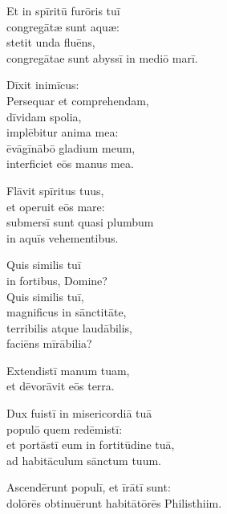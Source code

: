 \begin{flushleft}
{    Et in spīritū furōris tuī\\
    congregātæ sunt aquæ:\\
    stetit unda fluēns,\\
    congregātae sunt abyssī in mediō marī.

    Dīxit inimīcus:\\
    Persequar et comprehendam,\\
    dīvidam spolia,\\
    implēbitur anima mea:\\
    ēvāgīnābō gladium meum,\\
    interficiet eōs manus mea.

    Flāvit spīritus tuus,\\
    et operuit eōs mare:\\
    submersī sunt quasi plumbum\\
    in aquīs vehementibus.

    Quis similis tuī\\
    in fortibus, Domine?\\
    Quis similis tuī,\\
    magnificus in sānctitāte,\\
    terribilis atque laudābilis,\\
    faciēns mīrābilia? 
    
Extendistī manum tuam,\\
et dēvorāvit eōs terra.
    
    Dux fuistī in misericordiā tuā\\
    populō quem redēmistī:\\
    et portāstī eum in fortitūdine tuā,\\
    ad habitāculum sānctum tuum.

Ascendērunt populī, et īrātī sunt:\\
dolōrēs obtinuērunt habitātōrēs Philisthiim.

}
\end{flushleft}
